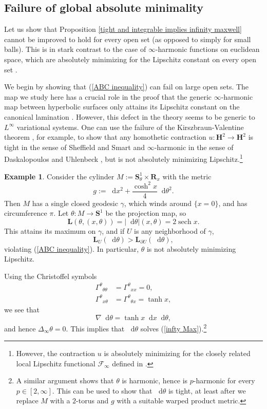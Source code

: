 \documentclass[reqno,11pt]{amsart}
\newcommand{\RR}{\mathbf{R}}
\newcommand{\Hyp}{\mathbf H}
\newcommand{\Sph}{\mathbf S}
\newcommand*\dif{\mathop{}\!\mathrm{d}}
\DeclareMathOperator{\sech}{sech}
\newcommand{\Comass}{\mathbf L}
\theoremstyle{definition}
\newtheorem{example}[theorem]{Example}
\numberwithin{equation}{section}
\begin{document}
\subsection{Failure of global absolute minimality}\label{nonintegrability}
Let us show that Proposition \ref{tight and integrable implies infinity maxwell} cannot be improved to hold for every open set (as opposed to simply for small balls).
This is in stark contrast to the case of $\infty$-harmonic functions on euclidean space, which are absolutely minimizing for the Lipschitz constant on every open set \cite{Crandall2008}.

We begin by showing that (\ref{ABC inequality}) can fail on large open sets.
The map we study here has a crucial role in the proof that the generic $\infty$-harmonic map between hyperbolic surfaces only attains its Lipschitz constant on the canonical lamination \cite{daskalopoulos2022}.
However, this defect in the theory seems to be generic to $L^\infty$ variational systems.
One can use the failure of the Kirszbraun-Valentine theorem \cite[Example 9.6]{Gu_ritaud_2017}, for example, to show that any homothetic contraction $u: \Hyp^2 \to \Hyp^2$ is tight in the sense of Sheffield and Smart \cite{Sheffield12} and $\infty$-harmonic in the sense of Daskalopoulos and Uhlenbeck \cite{daskalopoulos2022}, but is not absolutely minimizing Lipschitz.\footnote{However, the contraction $u$ is absolutely minimizing for the closely related local Lipschitz functional $\mathcal F_\infty$ defined in \cite{Crandall2008}.}

\begin{example}
Consider the cylinder $M := \Sph^1_\theta \times \RR_x$ with the metric
$$g := \dif x^2 + \frac{\cosh^2 x}{4} \dif \theta^2.$$
Then $M$ has a single closed geodesic $\gamma$, which winds around $\{x = 0\}$, and has circumference $\pi$.
Let $\theta: M \to \Sph^1$ be the projection map, so
$$\Comass(\theta, (x, \theta)) = |\dif \theta|(x, \theta) = 2 \sech x.$$
This attains its maximum on $\gamma$, and if $U$ is any neighborhood of $\gamma$,
$$\Comass_U(\dif \theta) > \Comass_{\partial U}(\dif \theta),$$
violating (\ref{ABC inequality}).
In particular, $\theta$ is not absolutely minimizing Lipschitz.

Using the Christoffel symbols
\begin{align*}
{\Gamma^\theta}_{\theta \theta} &= {\Gamma^\theta}_{x x} = 0, \\
{\Gamma^\theta}_{x \theta} &= {\Gamma^\theta}_{\theta x} = \tanh x,
\end{align*}
we see that
$$\nabla \dif \theta = \tanh x \dif x \dif \theta,$$
and hence $\Delta_\infty \theta = 0$.
This implies that $\dif \theta$ solves (\ref{infty Max}).\footnote{A similar argument shows that $\theta$ is harmonic, hence is $p$-harmonic for every $p \in [2, \infty]$. This can be used to show that $\dif \theta$ is tight, at least after we replace $M$ with a $2$-torus and $g$ with a suitable warped product metric.}
\end{example}
\end{document}
